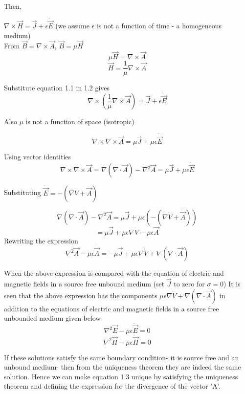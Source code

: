 Then,

$\nabla\times\vec{H}=\vec{J}+\epsilon\dot{\vec{E}}$ (we assume $\epsilon$ is not a function of time - a homogeneous medium) \\

From $\vec{B}=\nabla\times\vec{A}$, $\vec{B}=\mu\vec{H}$
\begin{equation}
\mu\vec{H}=\nabla\times\vec{A}
\end{equation}
\begin{equation}
\vec{H}=\dfrac{1}{\mu}\nabla\times\vec{A}
\end{equation}


Substitute equation 1.1 in 1.2 gives $$\nabla\times(\dfrac{1}{\mu}\nabla\times\vec{A})=\vec{J}+\epsilon\dot{\vec{E}}$$

Also $\mu$ is not a function of space (isotropic)

$$\nabla\times\nabla\times\vec{A}=\mu\vec{J}+\mu\epsilon\dot{\vec{E}}$$ 

Using vector identities
$$\nabla\times\nabla\times\vec{A}= \nabla(\nabla\cdot\vec{A}) -\nabla^{2}\vec{A}=\mu\vec{J}+\mu\epsilon\dot{\vec{E}}$$

Substituting $\dot{\vec{E}}=-(\nabla\dot{V}+\ddot{\vec{A}})$

$$\nabla(\nabla\cdot\vec{A}) -\nabla^{2}\vec{A}=\mu\vec{J}+\mu\epsilon(-(\nabla\dot{V}+\ddot{\vec{A}}))$$
$$=\mu\vec{J}+\mu\epsilon\nabla\dot{V}-\mu\epsilon\vec{A}$$ 
Rewriting the expression
\begin{equation}
\nabla^{2}\vec{A}-\mu\epsilon\ddot{\vec{A}}=-\mu\vec{J}+\mu\epsilon\nabla\dot{V}+\nabla(\nabla\cdot\vec{A})
\end{equation}


When the above expression is compared with the equation of electric and magnetic fields in a source free unbound medium (set $\vec{J}$ to zero for $\sigma=0$) It is seen that the above expression has the components $\mu\epsilon\nabla\dot{V}+\nabla(\nabla\cdot\vec{A})$ in addition to the equations of electric and magnetic fields in a source free unbounded medium given below
$$\nabla^{2}\vec{E}-\mu\epsilon\ddot{\vec{E}}=0$$
$$\nabla^{2}\vec{H}-\mu\epsilon\ddot{\vec{H}}=0$$


If these solutions satisfy the same boundary condition- it is source free and an unbound medium- then from the uniqueness theorem they are indeed the same solution. Hence we can make equation 1.3 unique by satisfying the uniqueness theorem and defining the expression for the divergence of the vector 'A'.

